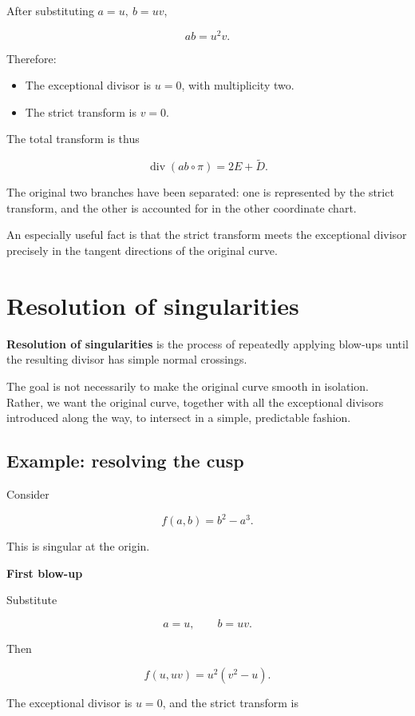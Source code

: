 \documentclass[12pt]{article}
\begin{document}
After substituting \(a=u,\ b=uv\),

\[
ab=u^2v.
\]

Therefore:

\begin{itemize}
\item
  The exceptional divisor is \(u=0\), with multiplicity two.
\item
  The strict transform is \(v=0\).
\end{itemize}

The total transform is thus

\[
\operatorname{div}(ab\circ\pi)=2E+\widetilde D.
\]

The original two branches have been separated: one is represented by the
strict transform, and the other is accounted for in the other coordinate
chart.

An especially useful fact is that the strict transform meets the
exceptional divisor precisely in the tangent directions of the original
curve.

\newpage
\section{Resolution of
singularities}\label{resolution-of-singularities}

\textbf{Resolution of singularities} is the process of repeatedly
applying blow-ups until the resulting divisor has simple normal
crossings.

The goal is not necessarily to make the original curve smooth in
isolation. Rather, we want the original curve, together with all the
exceptional divisors introduced along the way, to intersect in a simple,
predictable fashion.

\subsection{Example: resolving the
cusp}\label{example-resolving-the-cusp}

Consider

\[
f(a,b)=b^2-a^3.
\]

This is singular at the origin.

\textbf{First blow-up}

Substitute

\[
a=u,\qquad b=uv.
\]

Then

\[
f(u,uv)=u^2(v^2-u).
\]

The exceptional divisor is \(u=0\), and the strict transform is
\end{document}
